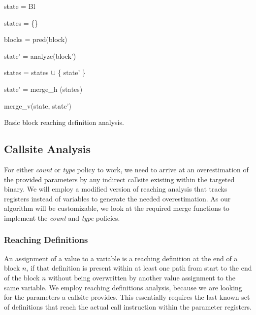 \begin{algorithm}[!ht]
	\SetAlgoLined
        \BlankLine
	{
 	state = Bl                                   
 	

	states = \{\}                                
	
	blocks = pred(block)                         
	
	 {
	
 		state' = analyze(block')             
 		
		states = states $\cup$ \{ state' \}  
	}

	state' = merge\_h (states)                   

	\Return merge\_v(state, state')              

	}
\caption{Basic block reaching definition analysis.}
\label{alg:reaching}
\end{algorithm}

\subsection{Callsite Analysis}
\label{section:callsiteanalysis}
For either \emph{count} or \emph{type} policy to work, we need to arrive at an overestimation of the provided parameters by any indirect callsite 
existing within the targeted binary. We will employ a modified version of reaching analysis that tracks registers instead of variables to 
generate the needed overestimation. As our algorithm will be customizable, we look at the required merge functions to implement the \emph{count} and \emph{type} policies. 

\subsubsection{Reaching Definitions}
\label{subsection:reachindefinitionstheory}
An assignment of a value to a variable is a reaching definition at the end of a block $n$, if that definition is present within at 
least one path from start to the end of the block $n$ without being overwritten by another value assignment to the same variable. 
We employ reaching definitions analysis, because we are looking for the parameters a callsite provides. This essentially 
requires the last known set of definitions that reach the actual call instruction within the parameter registers.

